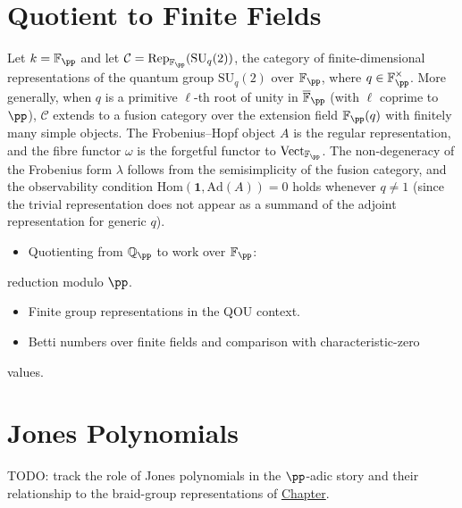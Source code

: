 \section{Quotient to Finite Fields}
\label{sec:finite-fields}

\begin{example}
  \label{ex:finite-field-realisation}
Let $k = \mathbb{F}_\pp$ and let $\mathcal{C} =
\mathrm{Rep}_{\mathbb{F}_\pp}(\mathrm{SU}_q(2))$, the category of
finite-dimensional representations of the quantum group
$\mathrm{SU}_q(2)$ over $\mathbb{F}_\pp$, where $q \in
\mathbb{F}_\pp^{\times}$.  More generally, when $q$ is a primitive
$\ell$-th root of unity in $\overline{\mathbb{F}}_\pp$ (with $\ell$
coprime to $\pp$), $\mathcal{C}$ extends to a fusion category over the
extension field $\mathbb{F}_\pp(q)$ with finitely many simple objects.
The Frobenius--Hopf object $A$ is the regular representation, and
the fibre functor $\omega$ is the forgetful functor to
$\mathrm{Vect}_{\mathbb{F}_\pp}$.  The non-degeneracy of the
Frobenius form $\lambda$ follows from the semisimplicity of the fusion
category, and the observability condition
$\mathrm{Hom}(\mathbf{1}, \mathrm{Ad}(A)) = 0$ holds whenever $q \neq 1$
(since the trivial representation does not appear as a summand of the
adjoint representation for generic $q$).
\end{example}

\begin{itemize}
  \item Quotienting from $\mathbb{Q}_\pp$ to work over $\mathbb{F}_\pp$:
\end{itemize}
  reduction modulo $\pp$.
\begin{itemize}
  \item Finite group representations in the QOU context.
  \item Betti numbers over finite fields and comparison with characteristic-zero
\end{itemize}
  values.

\section{Jones Polynomials}
\label{sec:jones-polynomials}

TODO: track the role of Jones polynomials in the $\pp$-adic story and their
relationship to the braid-group representations of
\hyperref[chap:path-integrals-braiding]{Chapter}.
